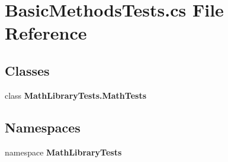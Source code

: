 \section{Basic\+Methods\+Tests.\+cs File Reference}
\label{_basic_methods_tests_8cs}
\subsection*{Classes}
\begin{DoxyCompactItemize}
\item 
class \textbf{ Math\+Library\+Tests.\+Math\+Tests}
\end{DoxyCompactItemize}
\subsection*{Namespaces}
\begin{DoxyCompactItemize}
\item 
namespace \textbf{ Math\+Library\+Tests}
\end{DoxyCompactItemize}
